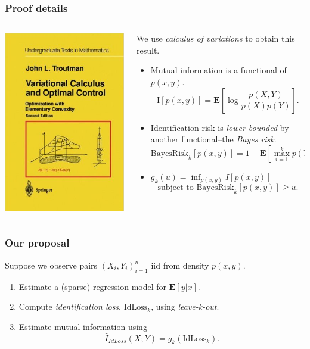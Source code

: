 \documentclass{beamer}
\newcommand{\E}{\textbf{E}}
\begin{document}
\begin{frame}
\frametitle{Proof details}
\begin{columns}
\begin{column}{0.25\textwidth}
\includegraphics[scale = 0.27]{vcalc.jpg}
\end{column}
\begin{column}{0.75\textwidth}
We use \emph{calculus of variations} to obtain this result. \pause
\begin{itemize}
\item Mutual information is a functional of $p(x, y)$. 
\[
\text{I}[p(x, y)] = \E\left[\log \frac{p(X, Y)}{p(X)p(Y)}\right].
\]
\pause
\item Identification risk is \emph{lower-bounded} by another functional--the \emph{Bayes risk}. 
\[
\text{BayesRisk}_k[p(x, y)] = 1-\E[\max_{i=1}^k p(Y|X_i)].
\]
\pause
\item $g_k(u) = \inf_{p(x, y)} I[p(x, y)]$ \[\text{subject to BayesRisk}_k[p(x, y)] \geq u.\]
\end{itemize}
\end{column}
\end{columns}
\end{frame}

\begin{frame}
\frametitle{Our proposal}
Suppose we observe pairs $(X_i,Y_i)_{i=1}^n$ iid from density $p(x, y)$.
\begin{enumerate}
\item Estimate a (sparse) regression model for $\E[y|x]$.
\item Compute \emph{identification loss}, $\text{IdLoss}_k$, using \emph{leave-k-out}.
\item Estimate mutual information using
\[
\hat{I}_{IdLoss}(X; Y) = g_k(\text{IdLoss}_k).
\]
\end{enumerate}
\end{frame}
\end{document}
